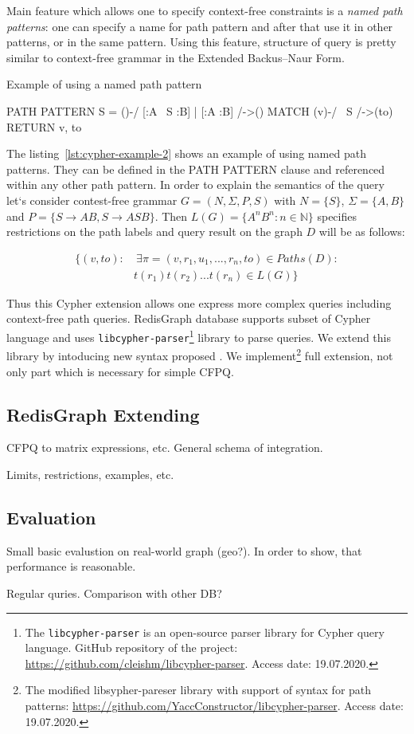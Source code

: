 Main feature which allows one to specify context-free constraints is a \textit{named path patterns}: one can specify a name for path pattern and after that use it in other patterns, or in the same pattern. Using this feature, structure of query is pretty similar to context-free grammar in the Extended Backus–Naur Form.

\begin{algorithm}
\begin{algorithmic}[1]
\caption{Example of using a named path pattern}
\label{lst:cypher-example-2}
\State PATH PATTERN S = ()-/ [:A ~S :B] | [:A :B] /->()
\State MATCH (v)-/ ~S /->(to)
\State RETURN v, to
\end{algorithmic}
\end{algorithm}

The listing~\ref{lst:cypher-example-2} shows an example of using named path patterns. They can be defined in the PATH PATTERN clause and referenced within any other path pattern. In order to explain the semantics of the query let`s consider contest-free grammar $G=(N, \Sigma, P, S)$ with $N=\{S\}$, $\Sigma=\{A,B\}$ and $P=\{S \xrightarrow{} A B, S \xrightarrow{} ASB \}$. Then $L(G)=\{A^nB^n: n \in \mathbb{N}\}$ specifies restrictions on the path labels and query result on the graph $D$ will be as follows:

\begin{align*}
\{ (v, to): &~\exists \pi=(v,r_1,u_1,...,r_n,to) \in Paths(D): \\
            &t(r_1)t(r_2)...t(r_n) \in L(G) \}
\end{align*}

Thus this Cypher extension allows one express more complex queries including context-free path queries.
RedisGraph database supports subset of Cypher language and uses \texttt{libcypher-parser}\footnote{The \texttt{libcypher-parser} is an open-source parser library for Cypher query language. GitHub repository of the project: \url{https://github.com/cleishm/libcypher-parser}. Access date: 19.07.2020.} library to parse queries.
We extend this library by intoducing new syntax proposed . We implement\footnote{The modified libsypher-pareser library with support of syntax for path patterns: \url{https://github.com/YaccConstructor/libcypher-parser}. Access date: 19.07.2020.} full extension, not only part which is necessary for simple CFPQ. 

\subsection{RedisGraph Extending}

CFPQ to matrix expressions, etc. General schema of integration.

Limits, restrictions, examples, etc.

\subsection{Evaluation}

Small basic evalustion on real-world graph (geo?).
In order to show, that performance is reasonable.

Regular quries. Comparison with other DB?
